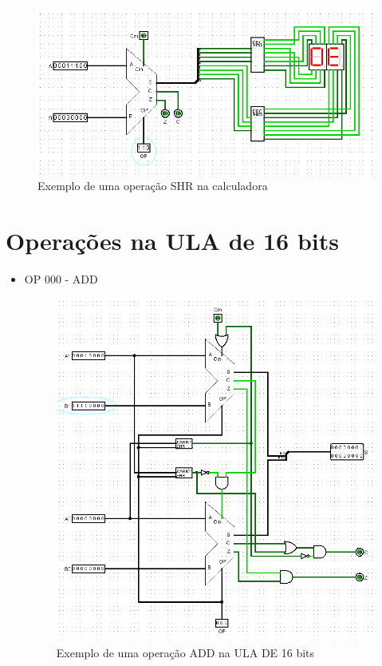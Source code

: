 \documentclass[
	12pt,				%
	openright,			%
	twoside,			%
	a4paper,			%
	english,			%
	french,				%
	spanish,			%
	brazil,				%
	]{abntex2}
\begin{document}
\begin{apendicesenv}
\begin{itemize}
\begin{figure}[H]
	\begin{center}
	    \includegraphics[scale=0.55]{calc110shr.png}
	\end{center}
\caption{\label{calc110shr}Exemplo de uma operação SHR na calculadora}
\end{figure}

\end{itemize}

\newpage

\section{Operações na ULA de 16 bits}

\begin{itemize}
\item {OP 000 - ADD}

\begin{figure}[H]
	\begin{center}
	    \includegraphics[scale=0.6]{ULA16Soma.png}
	\end{center}
\caption{\label{ula16add}Exemplo de uma operação ADD na ULA DE 16 bits}
\end{figure}


\end{itemize}
\end{apendicesenv}
\end{document}
